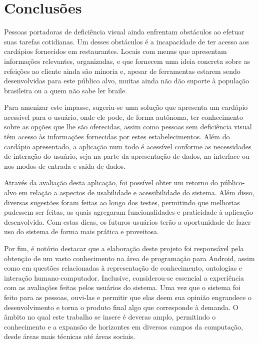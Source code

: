 \chapter{\label{chap:conclu}Conclusões}

Pessoas portadoras de deficiência visual ainda enfrentam obstáculos ao efetuar suas tarefas cotidianas. Um desses obstáculos é a incapacidade de ter acesso aos cardápios fornecidos em restaurantes. Locais com menus que apresentam informações relevantes, organizadas, e que fornecem uma ideia concreta sobre as refeições ao cliente ainda são minoria e, apesar de ferramentas estarem sendo desenvolvidas para este público alvo, muitas ainda não dão suporte à população brasileira ou a quem não sabe ler braile.

Para amenizar este impasse, sugeriu-se uma solução que apresenta um cardápio acessível para o usuário, onde ele pode, de forma autônoma, ter conhecimento sobre as opções que lhe são oferecidas, assim como pessoas sem deficiência visual têm acesso às informações fornecidas por estes estabelecimentos. Além do cardápio apresentado, a aplicação num todo é acessível conforme as necessidades de interação do usuário, seja na parte da apresentação de dados, na interface ou nos modos de entrada e saída de dados.

\color{blue}
Através da avaliação desta aplicação, foi possível obter um retorno do público-alvo em relação a aspectos de usabilidade e acessibilidade do sistema. Além disso, diversas sugestões foram feitas ao longo dos testes, permitindo que melhorias pudessem ser feitas, as quais agregaram funcionalidades e praticidade à aplicação desenvolvida. Com estas dicas, os futuros usuários terão a oportunidade de fazer uso do sistema de forma mais prática e proveitosa.

Por fim, é notório destacar que a elaboração deste projeto foi responsável pela obtenção de um vasto conhecimento na área de programação para Android, assim como em questões relacionadas à representação de conhecimento, ontologias e interação humano-computador. Inclusive, considerou-se essencial a experiência com as avaliações feitas pelos usuários do sistema. Uma vez que o sistema foi feito para as pessoas, ouvi-las e permitir que elas deem sua opinião engrandece o desenvolvimento e torna o produto final algo que corresponde à demanda. O âmbito no qual este trabalho se insere é deveras amplo, permitindo o conhecimento e a expansão de horizontes em diversos campos da computação, desde áreas mais técnicas até áreas sociais. 

